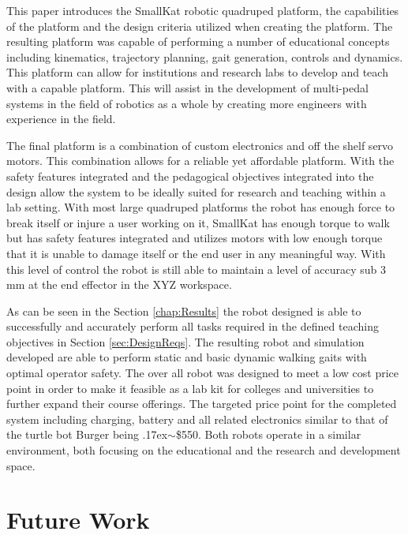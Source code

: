\documentclass[12pt]{report}
\newcommand{\approximately}{{\raise.17ex\hbox{$\scriptstyle\mathtt{\sim}$}}}
\begin{document}
This paper introduces the SmallKat robotic quadruped platform, the capabilities of the platform and the design criteria utilized when creating the platform. The resulting platform was capable of performing a number of educational concepts including kinematics, trajectory planning, gait generation, controls and dynamics. This platform can allow for institutions and research labs to develop and teach with a capable platform. This will assist in the development of multi-pedal systems in the field of robotics as a whole by creating more engineers with experience in the field.

The final platform is a combination of custom electronics and off the shelf servo motors. This combination allows for a reliable yet affordable platform. With the safety features integrated and the pedagogical objectives integrated into the design allow the system to be ideally suited for research and teaching within a lab setting. With most large quadruped platforms the robot has enough force to break itself or injure a user working on it, SmallKat has enough torque to walk but has safety features integrated and utilizes motors with low enough torque that it is unable to damage itself or the end user in any meaningful way. With this level of control the robot is still able to maintain a level of accuracy sub 3 mm at the end effector in the XYZ workspace.

As can be seen in the Section \ref{chap:Results} the robot designed is able to successfully and accurately perform all tasks required in the defined teaching objectives in Section \ref{sec:DesignReqs}. The resulting robot and simulation developed are able to perform static and basic dynamic walking gaits with optimal operator safety. The over all robot was designed to meet a low cost price point in order to make it feasible as a lab kit for colleges and universities to further expand their course offerings. The targeted price point for the completed system including charging, battery and all related electronics similar to that of the turtle bot Burger being \approximately\$550. Both robots operate in a similar environment, both focusing on the educational and the research and development space.

\section{Future Work}

\appendix
\singlespacing



\end{document}
